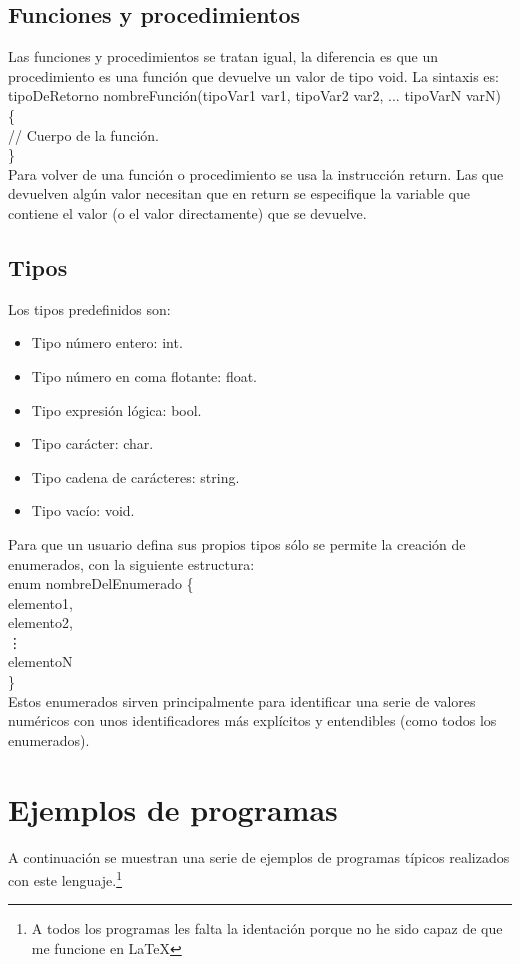 \documentclass[a4paper, 12pt]{article}
\begin{document}
\subsection{Funciones y procedimientos}
Las funciones y procedimientos se tratan igual, la diferencia es que un procedimiento es una función que devuelve un valor de tipo void. La sintaxis es:\\

tipoDeRetorno nombreFunción(tipoVar1 var1, tipoVar2 var2, ... tipoVarN varN) \{ \\
// Cuerpo de la función.\\
\} \\

Para volver de una función o procedimiento se usa la instrucción return. Las que devuelven algún valor necesitan que en return se especifique la variable que contiene el valor (o el valor directamente) que se devuelve.
\subsection{Tipos}
Los tipos predefinidos son:
\begin{itemize}
\item Tipo número entero: int.
\item Tipo número en coma flotante: float.
\item Tipo expresión lógica: bool.
\item Tipo carácter: char.
\item Tipo cadena de carácteres: string.
\item Tipo vacío: void.
\end{itemize}
Para que un usuario defina sus propios tipos sólo se permite la creación de enumerados, con la siguiente estructura:\\

enum nombreDelEnumerado \{ \\
elemento1,\\
elemento2,\\
\vdots\\
elementoN\\
\} \\

Estos enumerados sirven principalmente para identificar una serie de valores numéricos con unos identificadores más explícitos y entendibles (como todos los enumerados).
\newpage

\section{Ejemplos de programas}
A continuación se muestran una serie de ejemplos de programas típicos realizados con este lenguaje.\footnote{A todos los programas les falta la identación porque no he sido capaz de que me funcione en \LaTeX}
\end{document}
